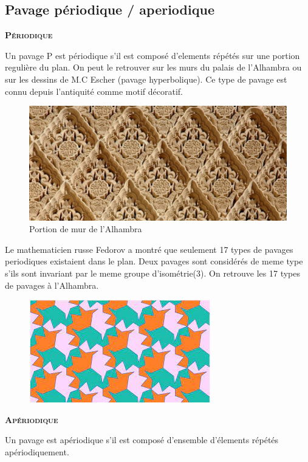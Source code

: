 \documentclass{article}
\begin{document}
\subsection{Pavage périodique / aperiodique}

\textbf{\textsc{Périodique}}

Un pavage P est périodique s'il est composé d'elements répétés sur une portion regulière du plan.
On peut le retrouver sur les murs du palais de l'Alhambra ou sur les dessins de M.C Escher (pavage hyperbolique).
Ce type de pavage est connu depuis l’antiquité comme motif décoratif.

\begin{figure} [h]
    \center
    \includegraphics [scale=0.3] {image/Alhambra.jpg}
    \caption{Portion de mur de l'Alhambra}
\end{figure}

Le mathematicien russe Fedorov a montré que seulement 17 types de pavages periodiques existaient dans le plan.
Deux pavages sont considérés de meme type s’ils sont invariant par le meme groupe d’isométrie(3).
On retrouve les 17 types de pavages à l'Alhambra.

\begin{figure} [h]
    \center
    \includegraphics [scale=0.5] {image/Ex1_pavage.jpg}
\end{figure}

\textbf{\textsc{Apériodique}}

Un pavage est apériodique s'il est composé d'ensemble d'élements répétés apériodiquement.
\end{document}

